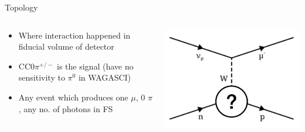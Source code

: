 \documentclass{beamer}
\begin{document}
\begin{frame}{Topology}

\begin{columns}[c]
\begin{column}{.5\textwidth}
\begin{itemize}
\item Where interaction happened in fiducial volume of detector
    \item CC0$\pi^{+/-}$ is the signal (have no sensitivity to $\pi^0$ in WAGASCI) 
    \item Any event which produces one $\mu$, 0 $\pi$, any no. of photons in FS
\end{itemize}
\end{column}
\begin{column}{.5\textwidth}
\includegraphics[width=\textwidth]{images/topology.png}
\end{column}
\end{columns}
\end{frame}
\end{document}

